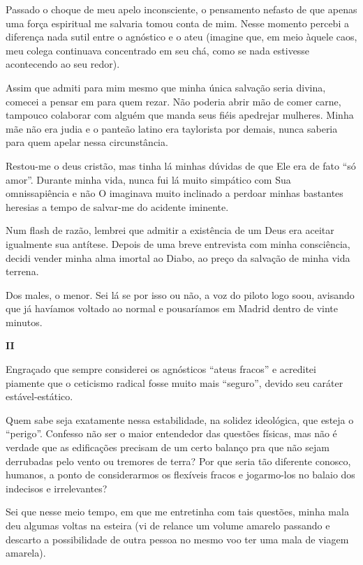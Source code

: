 Passado o choque de meu apelo inconsciente, o pensamento nefasto de que apenas uma força espiritual me salvaria tomou conta de mim. Nesse momento percebi a diferença nada sutil entre o agnóstico e o ateu (imagine que, em meio àquele caos, meu colega continuava concentrado em seu chá, como se nada estivesse acontecendo ao seu redor).

Assim que admiti para mim mesmo que minha única salvação seria divina, comecei a pensar em para quem rezar. Não poderia abrir mão de comer carne, tampouco colaborar com alguém que manda seus fiéis apedrejar mulheres. Minha mãe não era judia e o panteão latino era taylorista por demais, nunca saberia para quem apelar nessa circunstância.

Restou-me o deus cristão, mas tinha lá minhas dúvidas de que Ele era de fato ``só amor''. Durante minha vida, nunca fui lá muito simpático com Sua omnissapiência e não O imaginava muito inclinado a perdoar minhas bastantes heresias a tempo de salvar-me do acidente iminente.

Num flash de razão, lembrei que admitir a existência de um Deus era aceitar igualmente sua antítese. Depois de uma breve entrevista com minha consciência, decidi vender minha alma imortal ao Diabo, ao preço da salvação de minha vida terrena.

Dos males, o menor. Sei lá se por isso ou não, a voz do piloto logo soou, avisando que já havíamos voltado ao normal e pousaríamos em Madrid dentro de vinte minutos.

\newpage
\begin{center}
{\Large \textbf{II}}
\end{center}

Engraçado que sempre considerei os agnósticos ``ateus fracos'' e acreditei piamente que o ceticismo radical fosse muito mais ``seguro'', devido seu caráter estável-estático.

Quem sabe seja exatamente nessa estabilidade, na solidez ideológica, que esteja o ``perigo''. Confesso não ser o maior entendedor das questões físicas, mas não é verdade que as edificações precisam de um certo balanço pra que não sejam derrubadas pelo vento ou tremores de terra? Por que seria tão diferente conosco, humanos, a ponto de considerarmos os flexíveis fracos e jogarmo-los no balaio dos indecisos e irrelevantes?

Sei que nesse meio tempo, em que me entretinha com tais questões, minha mala deu algumas voltas na esteira (vi de relance um volume amarelo passando e descarto a possibilidade de outra pessoa no mesmo voo ter uma mala de viagem amarela).

